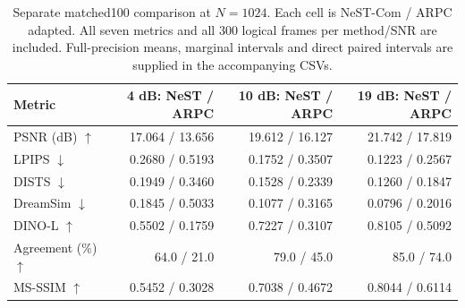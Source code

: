 \begin{table}[t]
\centering
\caption{Separate matched100 comparison at $N=1024$. Each cell is NeST-Com / ARPC adapted. All seven metrics and all 300 logical frames per method/SNR are included. Full-precision means, marginal intervals and direct paired intervals are supplied in the accompanying CSVs.}
\label{tab:arpc1024}
\small\setlength{\tabcolsep}{8pt}
\begin{tabular}{lrrr}
\toprule
Metric & 4 dB: NeST / ARPC & 10 dB: NeST / ARPC & 19 dB: NeST / ARPC \\
\midrule
PSNR (dB) $\uparrow$ & 17.064 / 13.656 & 19.612 / 16.127 & 21.742 / 17.819 \\
LPIPS $\downarrow$ & 0.2680 / 0.5193 & 0.1752 / 0.3507 & 0.1223 / 0.2567 \\
DISTS $\downarrow$ & 0.1949 / 0.3460 & 0.1528 / 0.2339 & 0.1260 / 0.1847 \\
DreamSim $\downarrow$ & 0.1845 / 0.5033 & 0.1077 / 0.3165 & 0.0796 / 0.2016 \\
DINO-L $\uparrow$ & 0.5502 / 0.1759 & 0.7227 / 0.3107 & 0.8105 / 0.5092 \\
Agreement (\%) $\uparrow$ & 64.0 / 21.0 & 79.0 / 45.0 & 85.0 / 74.0 \\
MS-SSIM $\uparrow$ & 0.5452 / 0.3028 & 0.7038 / 0.4672 & 0.8044 / 0.6114 \\
\bottomrule
\end{tabular}
\end{table}
